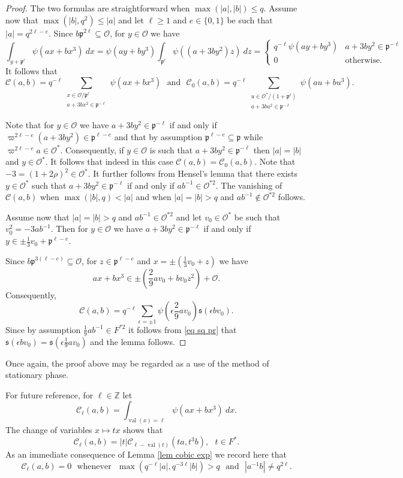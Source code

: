 \documentclass[12pt]{amsart}
\newcommand{\abs}[1]{\left|{#1}\right|}
\newcommand{\Z}{\mathbb{Z}}
\newcommand{\p}{\mathfrak{p}}
\renewcommand{\O}{\mathcal{O}}
\newcommand{\sq}{\mathfrak{s}}
\newcommand{\val}{{\operatorname{val}}}
\newcommand{\Cu}{\mathcal{C}}
\theoremstyle{remark}
\begin{document}
\begin{proof}
The two formulas are straightforward when $\max(\abs{a},\abs{b})\le q$. Assume now that $\max(\abs{b},q^2)\le \abs{a}$ and let $\ell\ge 1$ and $e\in\{0,1\}$ be such that $\abs{a}=q^{2\ell-e}$. 
Since $b\p^{2\ell}\subseteq \O$, for $y\in \O$ we have
\[
\int_{y+\p^\ell}\psi(ax+bx^3)\ dx=\psi(ay+by^3)\int_{\p^\ell}\psi((a+3by^2)z)\ dz=\begin{cases} 
q^{-\ell}\psi(ay+by^3) & a+3by^2\in\p^{-\ell} \\
0 & \text{otherwise.}
\end{cases}
\]
It follows that
\[
\Cu(a,b)=q^{-\ell}\sum_{\substack{x\in \O/\p^\ell\\ a+3bx^2\in \p^{-\ell}}}\psi(ax+bx^3)\ \ \  \text{and}\ \ \  
\Cu_0(a,b)=q^{-\ell}\sum_{\substack{u\in \O^*/(1+\p^\ell)\\a+3bu^2\in \p^{-\ell}}}\psi(au+bu^3). 
\]

Note that for $y\in \O$ we have $a+3by^2\in\p^{-\ell}$ if and only if $\varpi^{2\ell-e}(a+3by^2)\in\p^{\ell-e}$ and that by assumption $\p^{\ell-e}\subseteq \p$ while $\varpi^{2\ell-e}a\in \O^*$. Consequently, if $y\in \O$ is such that $a+3by^2\in\p^{-\ell}$ then $|a|=|b|$ and $y\in \O^*$. It follows that indeed in this case $\Cu(a,b)=\Cu_0(a,b)$.
Note that $-3=(1+2\rho)^2\in\O^*$. It further follows from Hensel's lemma that there exists $y\in\O^*$ such that $a+3by^2\in\p^{-\ell}$ if and only if $ab^{-1}\in\O^{*2}$. 
The vanishing of $\Cu(a,b)$ when $\max(\abs{b},q)<\abs{a}$ and when $\abs{a}=\abs{b}>q$ and $ab^{-1}\not\in\O^{*2}$ follows. 

Assume now that $\abs{a}=\abs{b}>q$ and $ab^{-1}\in\O^{*2}$ and let
$v_0\in\O^*$ be such that $v_0^2=-3 ab^{-1}$. Then for $y\in\O$ we have $a+3by^2\in\p^{-\ell}$ if and only if $y\in \pm \frac13v_0+\p^{\ell-e}$.

Since $b\p^{3(\ell-e)}\subseteq \O$, for $z\in \p^{\ell-e}$ and $x=\pm (\frac13v_0+z)$ we have
\[
ax+bx^3\in \pm (\frac29av_0+bv_0z^2)+\O.
\]
Consequently,
\[
\Cu(a,b)=q^{-\ell}\sum_{\epsilon=\pm 1}\psi(\epsilon\frac29av_0) \sq(\epsilon bv_0).
\]
Since by assumption $\frac19 ab^{-1}\in F^{*2}$ it follows from \eqref{eq sq pr} that $\sq(\epsilon bv_0)=\sq(\epsilon \frac19 av_0)$ and the lemma follows. 
\end{proof}

Once again, the proof above may be regarded as a use of the method of stationary phase.

For future reference, for $\ell\in \Z$ let
\[
\Cu_\ell(a,b)=\int_{\val(x)=\ell} \psi(ax+bx^3)\ dx.
\]
The change of variables $x\mapsto t x$ shows that 
\begin{equation}\label{eq cu l}
\Cu_\ell(a,b)=\abs{t}\Cu_{\ell-\val(t)}(t a,t^3b),\ \ \ t\in F^*.
\end{equation}
As an immediate consequence of Lemma \ref{lem cobic exp} we record here that
\begin{equation}\label{eq cu l is zero}
\Cu_\ell(a,b)=0\ \ \ \text{whenever} \ \ \ \max(q^{-\ell}\abs{a},q^{-3\ell}\abs{b})>q\ \ \ \text{and} \ \ \ \abs{a^{-1}b}\ne q^{2\ell}.
\end{equation}
\end{document}
